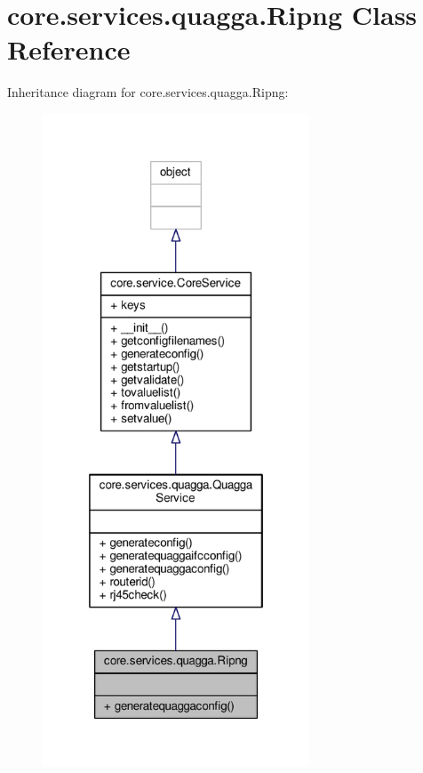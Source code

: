 \hypertarget{classcore_1_1services_1_1quagga_1_1_ripng}{\section{core.\+services.\+quagga.\+Ripng Class Reference}
\label{classcore_1_1services_1_1quagga_1_1_ripng}
}


Inheritance diagram for core.\+services.\+quagga.\+Ripng\+:
\nopagebreak
\begin{figure}[H]
\begin{center}
\leavevmode
\includegraphics[height=550pt]{classcore_1_1services_1_1quagga_1_1_ripng__inherit__graph}
\end{center}
\end{figure}


